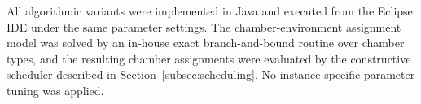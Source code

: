 
All algorithmic variants were implemented in Java and executed from the
Eclipse IDE under the same parameter settings. The chamber-environment
assignment model was solved by an in-house exact branch-and-bound routine over
chamber types, and the resulting chamber assignments were evaluated by the
constructive scheduler described in Section~\ref{subsec:scheduling}. No
instance-specific parameter tuning was applied.
